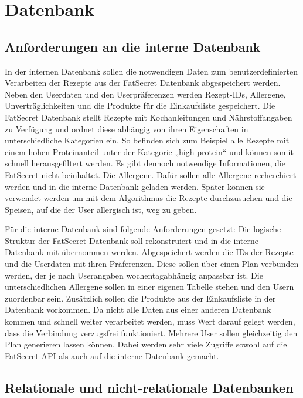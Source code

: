 \section{Datenbank}
\subsection{Anforderungen an die interne Datenbank}
In der internen Datenbank sollen die notwendigen Daten zum benutzerdefinierten Verarbeiten der Rezepte aus der FatSecret Datenbank abgespeichert werden. Neben den Userdaten und den Userpräferenzen werden Rezept-IDs, Allergene, Unverträglichkeiten und die Produkte für die Einkaufsliste gespeichert. Die FatSecret Datenbank stellt Rezepte mit Kochanleitungen und Nährstoffangaben zu Verfügung und ordnet diese abhängig von ihren Eigenschaften in unterschiedliche Kategorien ein. So befinden sich zum Beispiel alle Rezepte mit einem hohen Proteinanteil unter der Kategorie „high-protein“ und können somit schnell herausgefiltert werden. Es gibt dennoch notwendige Informationen, die FatSecret nicht beinhaltet. Die Allergene. Dafür sollen alle Allergene recherchiert werden und in die interne Datenbank geladen werden. Später können sie verwendet werden um mit dem Algorithmus die Rezepte durchzusuchen und die Speisen, auf die der User allergisch ist, weg zu geben.

Für die interne Datenbank sind folgende Anforderungen gesetzt: \linebreak
Die logische Struktur der FatSecret Datenbank soll rekonstruiert und in die interne Datenbank mit übernommen werden. Abgespeichert werden die IDs der Rezepte und die Userdaten mit ihren Präferenzen. Diese sollen über einen Plan verbunden werden, der je nach Userangaben wochentagabhängig anpassbar ist. Die unterschiedlichen Allergene sollen in einer eigenen Tabelle stehen und den Usern zuordenbar sein. Zusätzlich sollen die Produkte aus der Einkaufsliste in der Datenbank vorkommen. Da nicht alle Daten aus einer anderen Datenbank kommen und schnell weiter verarbeitet werden, muss Wert darauf gelegt werden, dass die Verbindung verzugsfrei funktioniert. Mehrere User sollen gleichzeitig den Plan generieren lassen können. Dabei werden sehr viele Zugriffe sowohl auf die FatSecret API als auch auf die interne Datenbank gemacht.

\subsection{Relationale und nicht-relationale Datenbanken}
